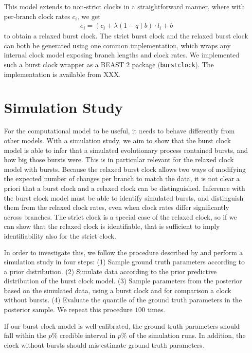 \documentclass[]{rsos}%
\begin{document}
This model extends to non-strict clocks in a straightforward manner, where with per-branch clock rates $c_i$, we get
\begin{align}
  e_i = (c_i + \lambda (1-q) b) \cdot l_i + b
  \label{eq:relaxed}
\end{align}
to obtain a relaxed burst clock.
The strict burst clock and the relaxed burst clock can both be generated using one common implementation, which wraps any internal clock model exposing branch lengths and clock rates.
We implemented such a burst clock wrapper as a BEAST 2 package (\texttt{burstclock}).
The implementation is available from XXX.

\section{Simulation Study}
\label{s:simulation}
For the computational model to be useful, it needs to behave differently from
other models. With a simulation study, we aim to show that the burst clock model is able to
infer that a simulated evolutionary process contained bursts, and how big those bursts were.
This is in particular relevant for the relaxed clock model with bursts.
Because the relaxed burst clock allows two ways of modifying the expected number
of changes per branch to match the data, it is not clear a priori that a burst
clock and a relaxed clock can be distinguished.
Inference with the burst clock model must be able to identify simulated bursts, and distinguish them from the relaxed clock rates, even when clock rates differ significantly across branches. The strict clock is a special case of the relaxed clock, so if we can show that the relaxed clock is identifiable, that is sufficient to imply identifiability also for the strict clock.

In order to investigate this,
we follow the procedure described by \textcite{cook2006validation} and perform a simulation study in four steps: (1) Sample ground truth parameters according to a prior distribution. (2) Simulate data according to the prior predictive distribution of the burst clock model. (3) Sample parameters from the posterior based on the simulated data, using a burst clock and for comparison a clock without bursts. (4) Evaluate the quantile of the ground truth parameters in the posterior sample.
We repeat this procedure $100$ times.

If our burst clock model is well calibrated, the ground truth parameters should fall within the $p\%$ credible interval in $p\%$ of the simulation runs. In addition, the clock without bursts should mis-estimate ground truth parameters.
\end{document}
